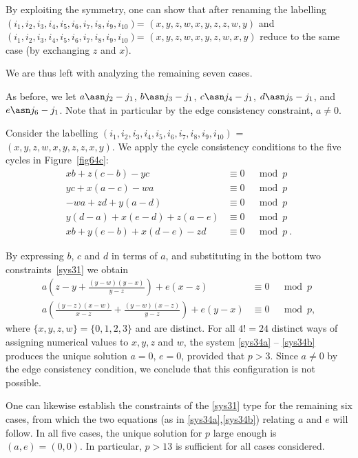 By exploiting the symmetry, one can show that after renaming the
labelling $(i_1,i_2,i_3,i_4,i_5,i_6,i_7,i_8,i_9,i_{10})$=
$(x,y,z,w,x,y,z,z,w,y)$ and
$(i_1,i_2,i_3,i_4,i_5,i_6,i_7,i_8,i_9,i_{10})$=
$(x,y,z,w,x,y,z,w,x,y)$ reduce to the same case (by exchanging $z$
and $x$). %

We are thus left with analyzing the remaining seven cases.

As before, we let $a \asn j_2-j_1$, $b \asn j_3-j_1$, $c \asn
j_4-j_1$,
 $d \asn j_5-j_1$, and $e \asn j_6-j_1$.  Note that in particular
 by the edge consistency constraint, $a \neq 0$.

Consider the labelling
$(i_1,i_2,i_3,i_4,i_5,i_6,i_7,i_8,i_9,i_{10})$ =
$(x,y,z,w,x,y,z,z,x,y)$. We apply the cycle consistency conditions
to the five cycles in Figure~\ref{fig64c}:
 \begin{equation}\label{sys31}\begin{array}{cccc}
 xb+z(c-b)-yc &\equiv 0 &\mod p\\
 yc+x(a-c)-wa &\equiv 0 &\mod p\\
 -wa+zd+y(a-d) &\equiv 0 &\mod p\\
 y(d-a)+x(e-d)+z(a-e) &\equiv 0 &\mod p\\
 xb+y(e-b)+x(d-e)-zd &\equiv 0 &\mod p~.
 \end{array}\end{equation}



By expressing $b$, $c$ and $d$ in terms of $a$, and substituting
in the bottom two constraints~\eqref{sys31} we obtain
\begin{eqnarray}\label{sys34a}
a\left(z-y+\frac{(y-w)(y-x)}{y-z}\right)+e(x-z) &\equiv 0 &\mod
p\\
\label{sys34b}a\left(\frac{(y-z)(x-w)}{x-z}+\frac{(y-w)(x-z)}{y-z}\right)+e(y-x)&\equiv
0 &\mod p,
\end{eqnarray}
where $\{x,y,z,w\} =\{0,1,2,3\}$ and are distinct. For all $4!=24$
distinct ways of assigning numerical values to $x,y,z$ and $w$,
the system \eqref{sys34a} -- \eqref{sys34b} produces the unique
solution $a=0$, $e=0$, provided that $p>3$. Since $a\neq 0$ by the
edge consistency condition, we conclude that this configuration is
not possible.

One can likewise establish the constraints of the \eqref{sys31}
type for the remaining six cases, from which the two equations (as
in \eqref{sys34a},\eqref{sys34b}) relating $a$ and $e$ will
follow. In all five cases, the unique solution for $p$ large
enough is $(a,e)=(0,0)$. In particular, $p>13$ is sufficient for
all cases considered.


